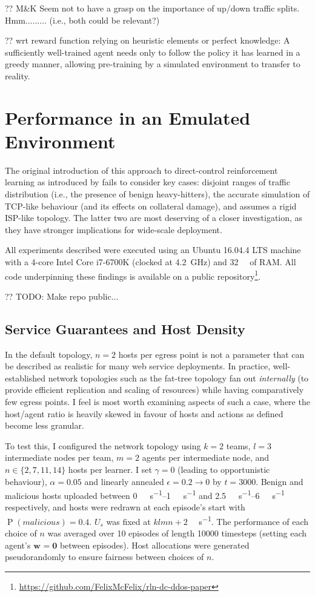 \documentclass[conference, letterpaper, 10pt, times]{IEEEtran}
\newcommand{\wvec}[1]{\ensuremath{\bm{w}_{#1}}}
\begin{document}
?? M\&K Seem not to have a grasp on the importance of up/down traffic splits. Hmm......... (i.e., both could be relevant?)

?? wrt reward function relying on heuristic elements or perfect knowledge:
A sufficiently well-trained agent needs only to follow the policy it has learned in a greedy manner, allowing pre-training by a simulated environment to transfer to reality.

\section{Performance in an Emulated Environment}
The original introduction of this approach to direct-control reinforcement learning as introduced by \textcite{DBLP:journals/eaai/MalialisK15} fails to consider key cases: disjoint ranges of traffic distribution (i.e., the presence of benign heavy-hitters), the accurate simulation of TCP-like behaviour (and its effects on collateral damage), and assumes a rigid ISP-like topology.
The latter two are most deserving of a closer investigation, as they have stronger implications for wide-scale deployment.

All experiments described were executed using an Ubuntu 16.04.4 LTS machine with a 4-core Intel Core i7-6700K (clocked at \SI{4.2}{\giga\hertz}) and \SI{32}{\gibi\byte} of RAM.
All code underpinning these findings is available on a public repository\footnote{\url{https://github.com/FelixMcFelix/rln-dc-ddos-paper}}.

?? TODO: Make repo public...

\subsection{Service Guarantees and Host Density}
In the default topology, $n=2$ hosts per egress point is not a parameter that can be described as realistic for many web service deployments.
In practice, well-established network topologies such as the fat-tree topology fan out \emph{internally} (to provide efficient replication and scaling of resources) while having comparatively few egress points.
I feel is most worth examining aspects of such a case, where the host/agent ratio is heavily skewed in favour of hosts and actions as defined become less granular.

To test this, I configured the network topology using $k=2$ teams, $l=3$ intermediate nodes per team, $m=2$ agents per intermediate node, and $n \in \{2, 7, 11, 14\}$ hosts per learner.
I set $\gamma=0$ (leading to opportunistic behaviour), $\alpha=0.05$ and linearly annealed $\epsilon=0.2 \rightarrow 0$ by $t=3000$.
Benign and malicious hosts uploaded between \SIrange{0}{1}{\mega\bit\per\second} and \SIrange{2.5}{6}{\mega\bit\per\second} respectively, and hosts were redrawn at each episode's start with $\operatorname{P}(\mathit{malicious})=0.4$.
$U_s$ was fixed at $klmn+2$ \si{\mega\bit\per\second}.
The performance of each choice of $n$ was averaged over \num{10} episodes of length \num{10000} timesteps (setting each agent's $\wvec{}=\bm{0}$ between episodes).
Host allocations were generated pseudorandomly to ensure fairness between choices of $n$.
\end{document}
